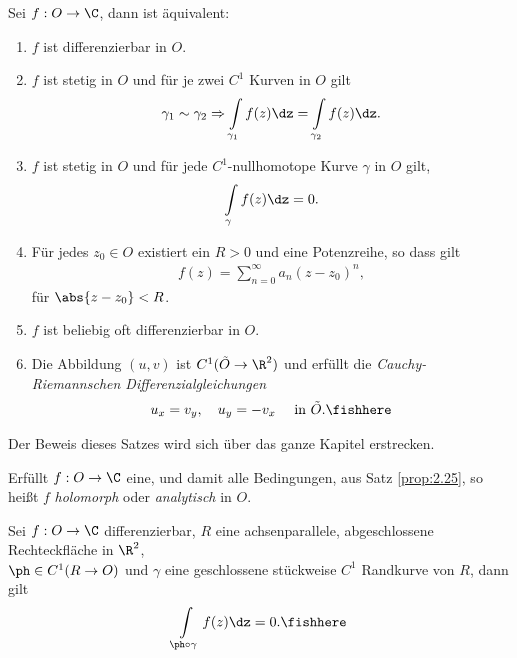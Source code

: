 \begin{prop}
\label{prop:2.25}
Sei $f:O\to\C$, dann ist äquivalent:
\begin{enumerate}[label=(\roman{*})]
  \item\label{prop:2.25.1} $f$ ist differenzierbar in $O$.
  \item\label{prop:2.25.2} $f$ ist stetig in $O$ und für je zwei $C^1$ Kurven
  in $O$ gilt
  \begin{align*}
  \gamma_1\sim\gamma_2 \Rightarrow \int\limits_{\gamma_1} f(z)\dz =
  \int\limits_{\gamma_2} f(z)\dz.
  \end{align*}
  \item\label{prop:2.25.3} $f$ ist stetig in $O$ und für jede
  $C^1$-nullhomotope Kurve $\gamma$ in $O$ gilt,
  \begin{align*}
  \int\limits_\gamma f(z) \dz = 0.
  \end{align*}
  \item\label{prop:2.25.4} Für jedes $z_0\in O$ existiert ein $R>0$ und eine
  Potenzreihe, so dass gilt
  \begin{align*}
  f(z) = \sum\limits_{n=0}^\infty a_n (z-z_0)^n,
  \end{align*}
  für $\abs{z-z_0} < R$.
  \item\label{prop:2.25.5} $f$ ist beliebig oft differenzierbar in $O$.
  \item\label{prop:2.25.6} Die Abbildung $(u,v)$ ist $C^1(\tilde{O}\to\R^2)$
  und erfüllt die
  \emph{Cauchy-Riemannschen Differenzialgleichungen}
  \begin{align*}
  u_x = v_y, \quad u_y = - v_x\quad \text{ in }\tilde{O}.\fishhere
  \end{align*}
\end{enumerate}
\end{prop}
Der Beweis dieses Satzes wird sich über das ganze Kapitel erstrecken.

\begin{defn}
\label{defn:2.26}
Erfüllt $f: O\to\C$ eine, und damit alle Bedingungen, aus Satz \ref{prop:2.25},
so heißt $f$ \emph{holomorph} oder \emph{analytisch} in $O$.
\end{defn}

\begin{prop}
\label{prop:2.27}
Sei $f: O\to\C$ differenzierbar, $R$ eine achsenparallele, abgeschlossene
Rechteckfläche in $\R^2$,\\ $\ph\in C^1(R\to O)$ und $\gamma$ eine geschlossene
stückweise $C^1$ Randkurve von $R$, dann gilt
\begin{align*}
\int\limits_{\ph\circ\gamma} f(z)\dz = 0.\fishhere
\end{align*}
\end{prop}


